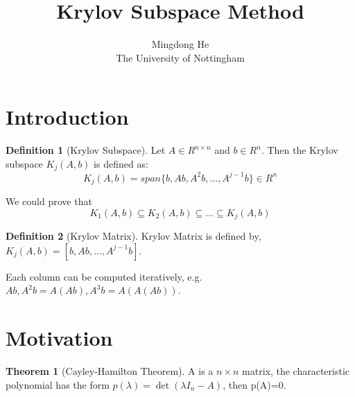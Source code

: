 \documentclass{article}
\theoremstyle{definition}
\newtheorem{definition}{Definition}[section]
\newtheorem{theorem}{Theorem}[section]
\begin{document}

\title{Krylov Subspace Method} %
\author{Mingdong He\\The University of Nottingham} 

\maketitle

\tableofcontents
%
\section{Introduction}
\begin{definition}[Krylov Subspace]
Let $A \in R^{n\times n}$ and $b \in R^n$. Then the Krylov subspace $K_j(A,b)$ is defined as:
\begin{equation}
K_j(A,b)=span\{b,Ab,A^2b,...,A^{j-1}b\} \in R^n
\end{equation}
\end{definition}
We could prove that
\begin{equation}
K_1(A,b) \subseteq K_2(A,b) \subseteq \ldots \subseteq K_j(A,b)
\end{equation}

\begin{definition}[Krylov Matrix]
Krylov Matrix is defined by, $K_j(A,b)=[b,Ab,\ldots,A^{j-1}b]$. 
\end{definition}

Each column can be computed iteratively, e.g. $Ab, A^2b=A(Ab),A^3b=A(A(Ab))$.

\section{Motivation}
\begin{theorem}[Cayley-Hamilton Theorem]
A is a $n\times n$ matrix, the characteristic polynomial has the form $p(\lambda)=\det(\lambda I_n-A)$, then p(A)=0.
\end{theorem}
\end{document}
